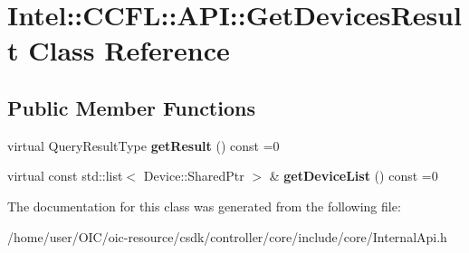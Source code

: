 \hypertarget{classIntel_1_1CCFL_1_1API_1_1GetDevicesResult}{}\section{Intel\+:\+:C\+C\+F\+L\+:\+:A\+P\+I\+:\+:Get\+Devices\+Result Class Reference}
\label{classIntel_1_1CCFL_1_1API_1_1GetDevicesResult}
\subsection*{Public Member Functions}
\begin{DoxyCompactItemize}
\item 
\hypertarget{classIntel_1_1CCFL_1_1API_1_1GetDevicesResult_a99af6e1592450e890a0418440a17b1cb}{}virtual Query\+Result\+Type {\bfseries get\+Result} () const =0\label{classIntel_1_1CCFL_1_1API_1_1GetDevicesResult_a99af6e1592450e890a0418440a17b1cb}

\item 
\hypertarget{classIntel_1_1CCFL_1_1API_1_1GetDevicesResult_ab2d0723361b75c8ddc7b7dfe2b11e8e7}{}virtual const std\+::list$<$ Device\+::\+Shared\+Ptr $>$ \& {\bfseries get\+Device\+List} () const =0\label{classIntel_1_1CCFL_1_1API_1_1GetDevicesResult_ab2d0723361b75c8ddc7b7dfe2b11e8e7}

\end{DoxyCompactItemize}


The documentation for this class was generated from the following file\+:\begin{DoxyCompactItemize}
\item 
/home/user/\+O\+I\+C/oic-\/resource/csdk/controller/core/include/core/Internal\+Api.\+h\end{DoxyCompactItemize}
